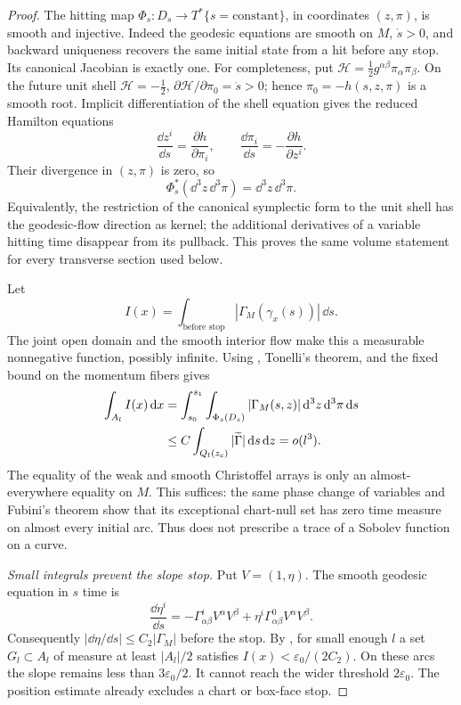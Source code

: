 \begin{proof}
The hitting map $\Phi_s:D_s\to T^*\{s=\mathrm{constant}\}$,
in coordinates $(z,\pi)$, is smooth and injective.  Indeed
the geodesic equations are smooth on $M$, $\dot s>0$, and
backward uniqueness recovers the same initial state from a
hit before any stop.  Its canonical Jacobian is exactly one.
For completeness, put
$\mathcal H=\tfrac12g^{\alpha\beta}\pi_\alpha\pi_\beta$.
On the future unit shell $\mathcal H=-\tfrac12$,
$\partial\mathcal H/\partial\pi_0=\dot s>0$; hence
$\pi_0=-h(s,z,\pi)$ is a smooth root.  Implicit
differentiation of the shell equation gives the reduced
Hamilton equations
\[
        \frac{\dd z^i}{\dd s}=\frac{\partial h}{\partial\pi_i},
        \qquad
        \frac{\dd\pi_i}{\dd s}=-\frac{\partial h}{\partial z^i}.
\]
Their divergence in $(z,\pi)$ is zero, so
\begin{equation}\label{ex:section-volume}
        \Phi_s^*(\dd^3z\,\dd^3\pi)
                  =\dd^3z\,\dd^3\pi.
\end{equation}
Equivalently, the restriction of the canonical symplectic
form to the unit shell has the geodesic-flow direction as
kernel; the additional derivatives of a variable hitting
time disappear from its pullback.  This proves the same
volume statement for every transverse section used below.

Let
\[
       I(x)=\int_{\text{before stop}}
                    |\Gamma_M(\gamma_x(s))|\,\dd s.
\]
The joint open domain and the smooth interior flow make this
a measurable nonnegative function, possibly infinite.
Using , Tonelli's theorem, and the
fixed bound on the momentum fibers gives
\begin{align}
 \int_{A_l} I(x)\,\mathrm d x
 &=\int_{s_0}^{s_1}\int_{\Phi_s(D_s)}
                |\Gamma_M(s,z)|\,\mathrm d^3z\,\mathrm d^3\pi\,\mathrm d s
       \notag\\
 &\le C\int_{Q_l(z_c)}|\widetilde\Gamma|\,\mathrm d s\,\mathrm d z
       =o(l^3).\label{ex:flow-average}
\end{align}
The equality of the weak and smooth Christoffel arrays is
only an almost-everywhere equality on $M$.  This suffices:
the same phase change of variables and Fubini's theorem show
that its exceptional chart-null set has zero time measure
on almost every initial arc.  Thus 
does not prescribe a trace of a Sobolev function on a curve.

\emph{Small integrals prevent the slope stop.}
Put $V=(1,\eta)$.  The smooth geodesic equation in $s$ time
is
\begin{equation}\label{ex:slope-equation}
 \frac{\dd\eta^i}{\dd s}
       =-\Gamma^i_{\alpha\beta}V^\alpha V^\beta
         +\eta^i\Gamma^0_{\alpha\beta}V^\alpha V^\beta.
\end{equation}
Consequently $|\dd\eta/\dd s|\le C_2|\Gamma_M|$ before
the stop.  By , for
small enough $l$ a set $G_l\subset A_l$ of measure at least
$|A_l|/2$ satisfies
$I(x)<\varepsilon_0/(2C_2)$.  On these arcs the slope remains
less than $3\varepsilon_0/2$.  It cannot reach the wider
threshold $2\varepsilon_0$.  The position estimate already
excludes a chart or box-face stop.


\end{proof}
